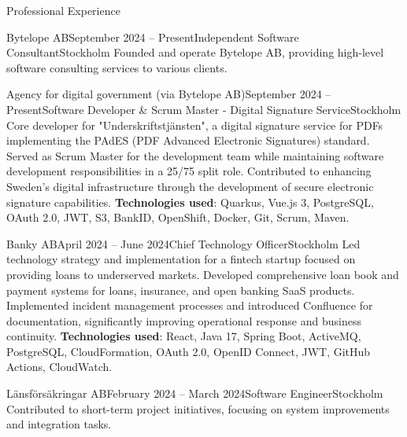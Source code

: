 \documentclass{resume}
\begin{document}
\begin{rSection}{Professional Experience}

\begin{rSubsection}{Bytelope AB}{September 2024 -- Present}{Independent Software Consultant}{Stockholm}
\bItem Founded and operate Bytelope AB, providing high-level software consulting services to various clients.
\end{rSubsection}

\begin{rSubsection}{Agency for digital government (via Bytelope AB)}{September 2024 -- Present}{Software Developer \& Scrum Master - Digital Signature Service}{Stockholm} %
\bItem Core developer for "Underskriftstjänsten", a digital signature service for PDFs implementing the PAdES (PDF Advanced Electronic Signatures) standard.
\bItem Served as Scrum Master for the development team while maintaining software development responsibilities in a 25/75 split role.
\bItem Contributed to enhancing Sweden's digital infrastructure through the development of secure electronic signature capabilities.
\bItem \textbf{Technologies used}: Quarkus, Vue.js 3, PostgreSQL, OAuth 2.0, JWT, S3, BankID, OpenShift, Docker, Git, Scrum, Maven.
\end{rSubsection}

\begin{rSubsection}{Banky AB}{April 2024 -- June 2024}{Chief Technology Officer}{Stockholm}
\bItem Led technology strategy and implementation for a fintech startup focused on providing loans to underserved markets.
\bItem Developed comprehensive loan book and payment systems for loans, insurance, and open banking SaaS products.
\bItem Implemented incident management processes and introduced Confluence for documentation, significantly improving operational response and business continuity.
\bItem \textbf{Technologies used}: React, Java 17, Spring Boot, ActiveMQ, PostgreSQL, CloudFormation, OAuth 2.0, OpenID Connect, JWT, GitHub Actions, CloudWatch.
\end{rSubsection}

\begin{rSubsection}{Länsförsäkringar AB}{February 2024 -- March 2024}{Software Engineer}{Stockholm}
\bItem Contributed to short-term project initiatives, focusing on system improvements and integration tasks.
\end{rSubsection}


\end{rSection}
\end{document}
